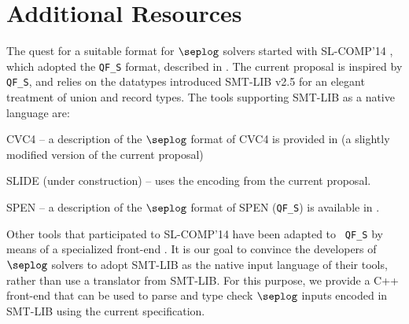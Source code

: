 \documentclass[10pt]{llncs}
\begin{document}
\section{Additional Resources}

The quest for a suitable format for $\seplog$ solvers started with
SL-COMP'14 \cite{sl-comp14}, which adopted the {\tt QF\_S} format,
described in \cite{qfs}. The current proposal is inspired by {\tt
  QF\_S}, and relies on the datatypes introduced SMT-LIB v2.5 for an
elegant treatment of union and record types. The tools supporting
SMT-LIB as a native language are: \begin{compactitem}
\item CVC4 \cite{ReynoldsIosifKingSerban16} -- a description of the $\seplog$
  format of CVC4 is provided in \cite{cvc4-seplog} (a slightly
  modified version of the current proposal)
\item SLIDE (under construction) -- uses the encoding from the current
  proposal.
\item SPEN \cite{spen} -- a description of the $\seplog$
  format of SPEN ({\tt QF\_S}) is available in \cite{qfs}.
\end{compactitem} 
Other tools that participated to SL-COMP'14 have been adapted to {\tt
  QF\_S} by means of a specialized front-end \cite{qfs-frontend}. It
is our goal to convince the developers of $\seplog$ solvers to adopt
SMT-LIB as the native input language of their tools, rather than use a
translator from SMT-LIB. For this purpose, we provide a C++ front-end
\cite{smtlib-frontend} that can be used to parse and type check
$\seplog$ inputs encoded in SMT-LIB using the current specification. 

 


\end{document}
